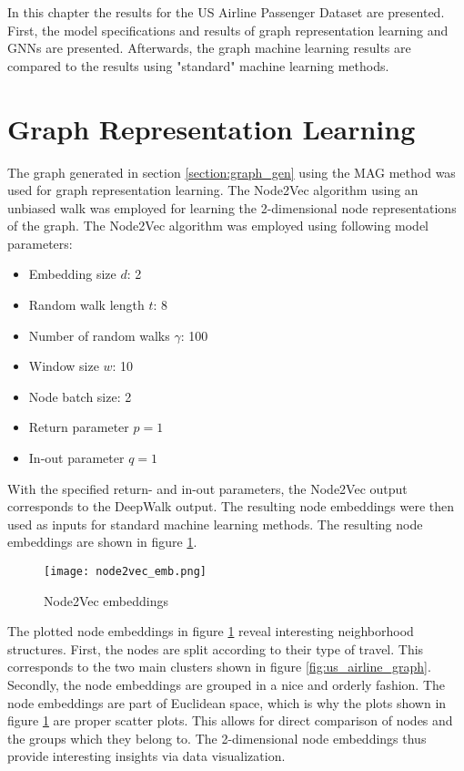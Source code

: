   
  In this chapter the results for the US Airline Passenger Dataset are
  presented. First, the model specifications and results of graph
  representation learning and GNNs are presented. Afterwards, the graph machine
  learning results are compared to the results using "standard" machine
  learning methods.

  \section{Graph Representation Learning}

  The graph generated in section \ref{section:graph_gen} using the MAG method
  was used for graph representation learning. The Node2Vec algorithm using an
  unbiased walk was employed for learning the 2-dimensional node representations 
  of the graph. The Node2Vec algorithm was employed using following model 
  parameters:

  \begin{itemize}
    \setlength\itemsep{0.1em}
    \item Embedding size $d$: 2
    \item Random walk length $t$: 8
    \item Number of random walks $\gamma$: 100
    \item Window size $w$: 10
    \item Node batch size: 2
    \item Return parameter $p=1$
    \item In-out parameter $q=1$
  \end{itemize}

  \noindent With the specified return- and in-out parameters, the Node2Vec
  output corresponds to the DeepWalk output. The resulting node embeddings were
  then used as inputs for standard machine learning methods. The resulting node 
  embeddings are shown in figure \ref{fig:node2vec}. 

  \begin{figure}[h]
		\centering
		\texttt{[image: node2vec\_emb.png]}
		\caption{Node2Vec embeddings}
        \label{fig:node2vec}
  \end{figure}

  \noindent The plotted node embeddings in figure \ref{fig:node2vec} reveal 
  interesting neighborhood structures. First, the nodes are split according to
  their type of travel. This corresponds to the two main clusters shown in
  figure \ref{fig:us_airline_graph}. Secondly, the node embeddings are grouped 
  in a nice and orderly fashion. The node embeddings are part of Euclidean
  space, which is why the plots shown in figure \ref{fig:node2vec} are proper
  scatter plots. This allows for direct comparison of nodes and the groups
  which they belong to. The 2-dimensional node embeddings thus provide 
  interesting insights via data visualization.\\

